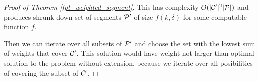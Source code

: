 \begin{proof}[Proof of Theorem \ref{fpt_weighted_segment}]
This has complexity $O(|\mathcal{C}'|^2|\mathcal{P}|)$ and produces shrunk down
set of segments $\mathcal{P}'$ of size $f(k, \delta)$
for some computable function $f$.

Then we can iterate over all subsets of $\mathcal{P}'$ and
choose the set with the lowest sum of weights that cover $\mathcal{C}'$.
This solution
would have weight not larger than optimal
solution to the problem without extension, because we iterate
over all posibilities of covering the subset of $\mathcal{C}'$.
\end{proof}

